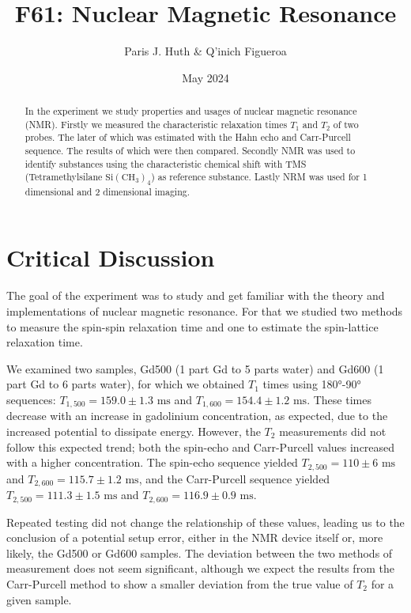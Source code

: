 \documentclass[11 pt]{article}
\title{F61: Nuclear Magnetic Resonance}
\author{Paris J. Huth \& Q'inich Figueroa}
\date{May 2024}
\begin{document}
\maketitle
\begin{center}
\begin{abstract}
In the experiment we study properties and usages of nuclear magnetic resonance (NMR). Firstly we measured the characteristic relaxation times $T_1$ and $T_2$ of two probes. The later of which was estimated with the Hahn echo and Carr-Purcell sequence. The results of which were then compared. Secondly NMR was used to identify substances using  the characteristic chemical shift with TMS (Tetramethylsilane $\mathrm{Si}\left(\mathrm{CH_3}\right)_4$) as reference substance. Lastly NRM was used for 1 dimensional and 2 dimensional imaging.  
\end{abstract}
\end{center}




\newpage
\section{Critical Discussion}
The goal of the experiment was to study and get familiar with the theory and implementations of nuclear magnetic resonance. For that we studied two methods to measure the spin-spin relaxation time and one to estimate the spin-lattice relaxation time.


	
We examined two samples, Gd500 (1 part Gd to 5 parts water) and Gd600 (1 part Gd to 6 parts water), for which we obtained $T_1$ times using 180°-90° sequences: $T_{1,500} = 159.0 ± 1.3 \text{ ms}$ and $T_{1,600} = 154.4 ± 1.2 \text{ ms}$. These times decrease with an increase in gadolinium concentration, as expected, due to the increased potential to dissipate energy. However, the $T_2$ measurements did not follow this expected trend; both the spin-echo and Carr-Purcell values increased with a higher concentration. The spin-echo sequence yielded $T_{2,500} = 110 ± 6 \text{ ms}$ and $T_{2,600} = 115.7 ± 1.2 \text{ ms}$, and the Carr-Purcell sequence yielded $T_{2,500} = 111.3 ± 1.5 \text{ ms}$ and $T_{2,600} = 116.9 ± 0.9 \text{ ms}$.	
	
Repeated testing did not change the relationship of these values, leading us to the conclusion of a potential setup error, either in the NMR device itself or, more likely, the Gd500 or Gd600 samples. The deviation between the two methods of measurement does not seem significant, although we expect the results from the Carr-Purcell method to show a smaller deviation from the true value of $T_2$ for a given sample.
\end{document}

